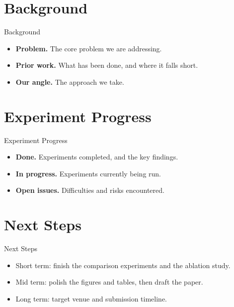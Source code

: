 
\section{Background}

\begin{frame}{Background}
  \begin{itemize}
    \item \textbf{Problem.} The core problem we are addressing.
    \item \textbf{Prior work.} What has been done, and where it falls short.
    \item \textbf{Our angle.} The approach we take.
  \end{itemize}
\end{frame}

\section{Experiment Progress}

\begin{frame}{Experiment Progress}
  \begin{itemize}
    \item \textbf{Done.} Experiments completed, and the key findings.
    \item \textbf{In progress.} Experiments currently being run.
    \item \textbf{Open issues.} Difficulties and risks encountered.
  \end{itemize}
\end{frame}

\section{Next Steps}

\begin{frame}{Next Steps}
  \begin{itemize}
    \item Short term: finish the comparison experiments and the ablation study.
    \item Mid term: polish the figures and tables, then draft the paper.
    \item Long term: target venue and submission timeline.
  \end{itemize}
\end{frame}
